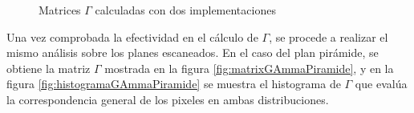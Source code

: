 \begin{figure}[H]
	\centering
	\hfill
	\caption{Matrices $\Gamma$ calculadas con dos implementaciones}
	\label{fig:barraAtravesaGamma}
\end{figure}

Una vez comprobada la efectividad en el cálculo de $\Gamma$, se procede a realizar el mismo análisis sobre los planes escaneados. En el caso del plan pirámide, se obtiene la matriz $\Gamma$ mostrada en la figura \ref{fig:matrixGAmmaPiramide}, y en la figura \ref{fig:histogramaGAmmaPiramide} se muestra el histograma de $\Gamma$ que evalúa la correspondencia general de los pixeles en ambas distribuciones.\\

